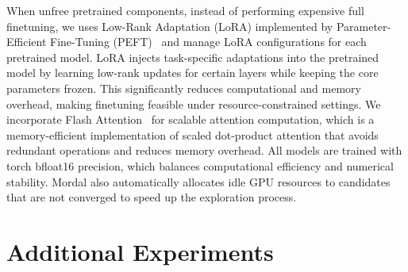 When unfree pretrained components, instead of performing expensive full finetuning, we uses Low-Rank Adaptation (LoRA) \cite{hu2021lora} implemented by Parameter-Efficient Fine-Tuning (PEFT)~\cite{peft} and manage LoRA configurations for each pretrained model. LoRA injects task-specific adaptations into the pretrained model by learning low-rank updates for certain layers while keeping the core parameters frozen. This significantly reduces computational and memory overhead, making finetuning feasible under resource-constrained settings. We incorporate Flash Attention~\cite{dao2023flashattention} for scalable attention computation, which is a memory-efficient implementation of scaled dot-product attention that avoids redundant operations and reduces memory overhead. All models are trained with torch bfloat16 precision, which balances computational efficiency and numerical stability. Mordal also automatically allocates idle GPU resources to candidates that are not converged to speed up the exploration process. 





\section{Additional Experiments}
\label{sec:additional_eval}

